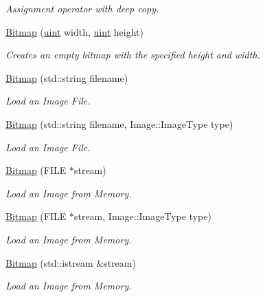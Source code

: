 \begin{DoxyCompactItemize}
\begin{DoxyCompactList}\small\item\em Assignment operator with deep copy. \item\end{DoxyCompactList}\item 
\hyperlink{class_f2_c_1_1_bitmap_a8e61f5101f6303564a679fd582051fe9}{Bitmap} (\hyperlink{namespace_f2_c_a58be2bac9eb3e3c99cb41b6008bf4fae}{uint} width, \hyperlink{namespace_f2_c_a58be2bac9eb3e3c99cb41b6008bf4fae}{uint} height)
\begin{DoxyCompactList}\small\item\em Creates an empty bitmap with the specified height and width. \item\end{DoxyCompactList}\item 
\hyperlink{class_f2_c_1_1_bitmap_a2fc3db9e8487a8826b5e2105963aad14}{Bitmap} (std::string filename)
\begin{DoxyCompactList}\small\item\em Load an Image File. \item\end{DoxyCompactList}\item 
\hyperlink{class_f2_c_1_1_bitmap_a89985844df7be6208ab82f479d7f0957}{Bitmap} (std::string filename, Image::ImageType type)
\begin{DoxyCompactList}\small\item\em Load an Image File. \item\end{DoxyCompactList}\item 
\hyperlink{class_f2_c_1_1_bitmap_a16a53001931f175f10408c42f395b066}{Bitmap} (FILE $\ast$stream)
\begin{DoxyCompactList}\small\item\em Load an Image from Memory. \item\end{DoxyCompactList}\item 
\hyperlink{class_f2_c_1_1_bitmap_a07b8097aee6bc62f28f6b8305d83ce96}{Bitmap} (FILE $\ast$stream, Image::ImageType type)
\begin{DoxyCompactList}\small\item\em Load an Image from Memory. \item\end{DoxyCompactList}\item 
\hyperlink{class_f2_c_1_1_bitmap_ae6dae98f50692de31b73e4f918cdc6d3}{Bitmap} (std::istream \&stream)
\begin{DoxyCompactList}\small\item\em Load an Image from Memory. \item\end{DoxyCompactList}\item 

\end{DoxyCompactItemize}
